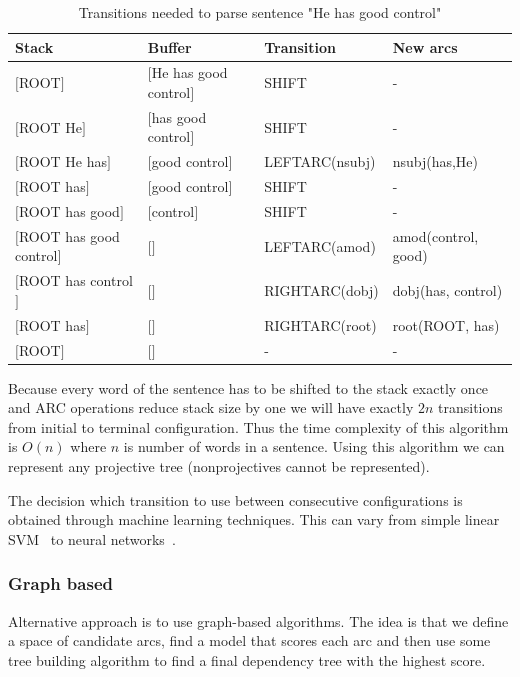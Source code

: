 \begin{table}[!htbp]
    \centering
{\footnotesize
    \begin{tabular}{l | l | l | l}
        Stack & Buffer & Transition & New arcs \\ \hline
        $[$ROOT$]$ & $[$He has good control$]$ & {\ttfamily SHIFT} & - \\
        $[$ROOT He$]$ & $[$has good control$]$ & {\ttfamily SHIFT} & - \\
        $[$ROOT He has$]$ & $[$good control$]$ & {\ttfamily LEFTARC(nsubj)} & nsubj(has,He) \\
        $[$ROOT has$]$ & $[$good control$]$ & {\ttfamily SHIFT} & - \\
        $[$ROOT has good$]$ & $[$control$]$ & {\ttfamily SHIFT} & - \\
        $[$ROOT has good control$]$ & $[$$]$ & {\ttfamily LEFTARC(amod)} & amod(control, good) \\
        $[$ROOT has control$]$ & $[$$]$ & {\ttfamily RIGHTARC(dobj)} & dobj(has, control) \\
        $[$ROOT has$]$ & $[$$]$ & {\ttfamily RIGHTARC(root)} & root(ROOT, has) \\
        $[$ROOT$]$ & $[$$]$ & - & - \\
    \end{tabular}
}
    \caption{Transitions needed to parse sentence "He has good control"}
    \label{tab:transition_parse}
\end{table}

Because every word of the sentence has to be shifted to the stack exactly once
and {\ttfamily ARC} operations reduce stack size by one we will have exactly
$2n$ transitions from initial to terminal configuration. Thus the time complexity of this
algorithm is $O(n)$ where $n$ is number of words in a sentence.
Using this algorithm we can represent any projective tree 
\cite{nivre_algorithms_2008} (nonprojectives cannot be represented).

\begin{sloppypar}
The decision which transition to use between consecutive configurations is
obtained through machine learning techniques. This can vary from simple
linear SVM~\cite{nivre_maltparser:_2005} to neural networks~\cite{chen_fast_2014,
andor_globally_2016}.
\end{sloppypar}

\subsubsection{Graph based}
Alternative approach is to use graph-based algorithms. The idea is that we define
a space of candidate arcs, find a model that scores each arc and then use some tree building 
algorithm to find a final dependency tree with the highest score.

